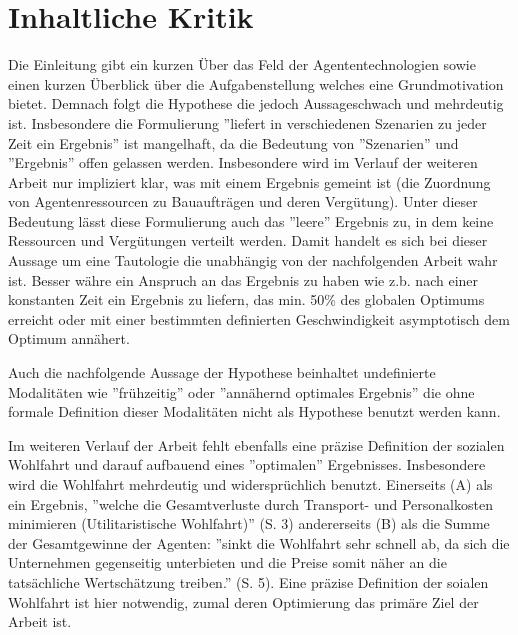 \documentclass[sigconf]{acmart}
\theoremstyle{break}
\begin{document}




\section{Inhaltliche Kritik}
\label{sec:ik}

Die Einleitung gibt ein kurzen Über das Feld der Agententechnologien sowie einen kurzen Überblick über die Aufgabenstellung welches eine Grundmotivation bietet. Demnach folgt die Hypothese die jedoch Aussageschwach und mehrdeutig ist. Insbesondere die Formulierung ''liefert in verschiedenen Szenarien zu jeder Zeit ein Ergebnis''
ist mangelhaft, da die Bedeutung von ''Szenarien'' und ''Ergebnis'' offen gelassen werden. Insbesondere wird im Verlauf der weiteren Arbeit nur impliziert klar, was mit einem Ergebnis gemeint ist (die Zuordnung von Agentenressourcen zu Bauaufträgen und deren Vergütung). Unter dieser Bedeutung lässt diese Formulierung auch das ''leere'' Ergebnis zu,
in dem keine Ressourcen und Vergütungen verteilt werden. Damit handelt es sich bei dieser Aussage um eine Tautologie die unabhängig von der nachfolgenden Arbeit wahr ist.
Besser währe ein Anspruch an das Ergebnis zu haben wie z.b. nach einer konstanten Zeit ein Ergebnis zu liefern, das min. 50\% des globalen Optimums erreicht oder mit einer bestimmten definierten Geschwindigkeit asymptotisch dem Optimum annähert.

Auch die nachfolgende Aussage der Hypothese beinhaltet undefinierte Modalitäten wie ''frühzeitig'' oder ''annähernd optimales Ergebnis'' die ohne formale Definition dieser Modalitäten nicht als Hypothese benutzt werden kann.


Im weiteren Verlauf der Arbeit fehlt ebenfalls eine präzise Definition der sozialen Wohlfahrt und darauf aufbauend eines ''optimalen'' Ergebnisses. Insbesondere wird die Wohlfahrt mehrdeutig und widersprüchlich benutzt. Einerseits (A) als ein Ergebnis,
''welche die Gesamtverluste durch Transport- und Personalkosten minimieren (Utilitaristische Wohlfahrt)'' (S. 3)
andererseits (B) als die Summe der Gesamtgewinne der Agenten: ''sinkt die Wohlfahrt sehr schnell ab, da sich die Unternehmen gegenseitig unterbieten und die Preise somit näher an die tatsächliche Wertschätzung treiben.'' (S. 5). Eine präzise Definition der soialen Wohlfahrt ist hier notwendig, zumal deren Optimierung das primäre Ziel der Arbeit ist.
\end{document}
